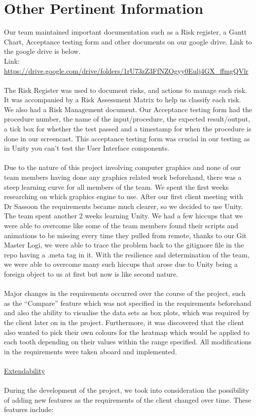 \documentclass[11pt,english, titlepage]{article}
\begin{document}
  \section*{Other Pertinent Information}
  Our team maintained important documentation such as a Risk register, a Gantt Chart, Acceptance testing form and other documents on our google drive. Link to the google drive is below.\\

  Link: \url{https://drive.google.com/drive/folders/1rU73zZ3FfNZOgyy0Eulj4GX_ffmgQVlr} \\
  \\
  The Risk Register was used to document risks, and actions to manage each risk. It was accompanied by a Risk Assessment Matrix to help us classify each risk. We also had a Risk Management document. Our Acceptance testing form had the procedure number, the name of the input/procedure, the expected result/output, a tick box for whether the test passed and a timestamp for when the procedure is done in our screencast. This acceptance testing form was crucial in our testing as in Unity you can't test the User Interface components. \\
  \\
  Due to the nature of this project involving computer graphics and none of our team members having done any graphics related work beforehand, there was a steep learning curve for all members of the team. We spent the first weeks researching on which graphics engine to use. After our first client meeting with Dr Sassoon the requirements became much clearer, so we decided to use Unity. The team spent another 2 weeks learning Unity.  We had a few hiccups that we were able to overcome like some of the team members found their scripts and animations to be missing every time they pulled from remote, thanks to our Git Master Logi, we were able to trace the problem back to the gitignore file in the repo having a  .meta tag in it. With the resilience and determination of the team, we were able to overcome many such hiccups that arose due to Unity being a foreign object to us at first but now is like second nature. \\
  \\
  Major changes in the requirements occurred over the course of the project, such as the ``Compare'' feature which was not specified in the requirements beforehand and also the ability to visualise the data sets as box plots, which was required by the client later on in the project. Furthermore, it was discovered that the client also wanted to pick their own colours for the heatmap which would be applied to each tooth depending on their values within the range specified. All modifications in the requirements were taken aboard and implemented. \\
  \\
  \underline{Extendability} \\
  \\
  During the development of the project, we took into consideration the possibility of adding new features as the requirements of the client changed over time. These features include:
\end{document}
